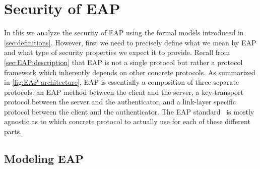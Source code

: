 \chapter{Security of EAP}\label{sec:generic_composition_results}


\begingroup
\hypersetup{linkcolor=black}
\minitoc
\endgroup

In this  we analyze the security of EAP using the formal models introduced in \cref{sec:definitions}.
However,
first we need to precisely define what we mean by EAP and what type of security properties we expect it to provide.
Recall from \cref{sec:EAP:description} that EAP is not a single protocol
but rather a protocol framework which inherently depends on other concrete protocols.
As summarized in \cref{fig:EAP-architecture},
EAP is essentially a composition of three separate protocols:
an EAP method between the client and the server,
a key-transport protocol between the server and the authenticator,
and a link-layer specific protocol between the client and the authenticator.
The EAP standard~\cite{IETF:RFC3748:EAP} is mostly agnostic as to which concrete protocol to actually use for each of these different parts.

\section{Modeling EAP}\label{sec:generic_composition_results:modeling_EAP}

